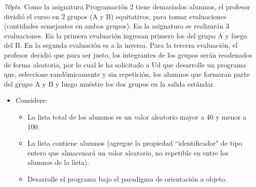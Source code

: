\documentclass[10pt]{article}
\begin{document}
\begin{enumerate}
{\begin{multicols}{2}
\end{multicols}
}
\newpage
{\scriptsize
\item \emph{70pts.} Como la asignatura Programaci\'on 2 tiene demasiados alumnos, el profesor dividi\'o el curso en 2 grupos (A y B) equitativos, para tomar evaluaciones (cantidades semejantes en ambos grupos). En la asignatura se realizar\'an 3 evaluaciones. En la primera evaluaci\'on ingresan primero los del grupo A y luego del B. En la segunda evaluaci\'on es a la inversa. Para la tercera evaluaci\'on, el profesor decidi\'o que para ser justo, los integrantes de los grupos ser\'an reodenados de forma aleatoria, por lo cual le ha solicitado a Ud que desarrolle un programa que, seleccione rand\'omicamente y sin repetici\'on, los alumnos que formaran parte del grupo A y B y luego mu\'estre los dos grupos en la salida est\'andar.
}
\begin{itemize}
    \item[] {\scriptsize Considere:}
    \begin{itemize}
        \item {\scriptsize La lista total de los alumnos es un valor aleatorio mayor a 40 y menor a 100.}
        \item {\scriptsize La lista contiene alumnos (agregue la propiedad ``identificador" de tipo entero que almacenar\'a un valor aleatorio, no repetible en entre los alumnos de la lista).}
        \item {\scriptsize Desarrolle el programa bajo el paradigma de orientación a objeto.}
    \end{itemize}
\end{itemize}


\end{enumerate}
\end{document}
